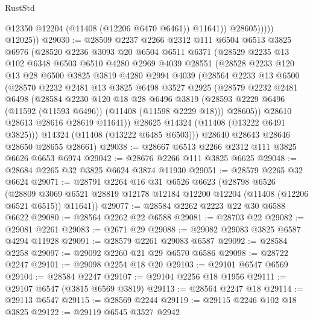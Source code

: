 \begin{lexlean}{RustStd}
\begin{coremodule}
                      @12350
                      @12204
                      (@11408 (@12206 @6470 @6461))
                      @11641))
                  @28605)))))
        @12025))
@29030 := @28509
    @2237
    @2266
    @2312
    @111
    @6504
    @6513
    @3825
    @6976
    (@28520
      @2236
      @3093
      @20
      @6504
      @6511
      @6371
      (@28529
        @2235
        @13
        @102
        @6348
        @6503
        @6510
        @4280
        @2969
        @4039
        @28551
        (@28528
          @2233
          @120
          @13
          @28
          @6500
          @3825
          @3819
          @4280
          @2994
          @4039
          (@28564
            @2233
            @13
            @6500
            (@28570
              @2232
              @2481
              @13
              @3825
              @6498
              @3527
              @2925
              (@28579
                @2232
                @2481
                @6498
                (@28584
                  @2230
                  @120
                  @18
                  @28
                  @6496
                  @3819
                  (@28593 @2229 @6496 (@11592 (@11593 @6496)) (@11408 (@11598 @2229 @18)))
                  @28605))
              @28610
              @28613
              @28616
              @28619
              @11641))
          @28625
          @14324
          (@11408 (@13222 @6491 @3825)))
        @14324
        (@11408 (@13222 @6485 @6503)))
      @28640
      @28643
      @28646
      @28650
      @28655
      @28661)
@29038 := @28667 @6513 @2266 @2312 @111 @3825 @6626 @6653 @6974
@29042 := @28676 @2266 @111 @3825 @6625
@29048 := @28684 @2265 @32 @3825 @6624 @3874 @11930
@29051 := @28579 @2265 @32 @6624
@29071 := @28791
    @2264
    @16
    @31
    @6526
    @6623
    (@28798
      @6526
      (@28809 @3069 @6521 @28819 @12178 @12184 @12200 @12204 (@11408 (@12206 @6521 @6515)) @11641))
@29077 := @28584 @2262 @2223 @22 @30 @6588 @6622
@29080 := @28564 @2262 @22 @6588
@29081 := @28703 @22
@29082 := @29081 @2261
@29083 := @2671 @29
@29088 := @29082 @29083 @3825 @6587 @4294 @11928
@29091 := @28579 @2261 @29083 @6587
@29092 := @28584 @2258
@29097 := @29092 @2260 @21 @29 @6570 @6586
@29098 := @28722 @2247
@29101 := @29098 @2254 @18 @20
@29103 := @29101 @6547 @6569
@29104 := @28584 @2247
@29107 := @29104 @2256 @18 @1956
@29111 := @29107 @6547 (@3815 @6569 @3819)
@29113 := @28564 @2247 @18
@29114 := @29113 @6547
@29115 := @28569 @2244
@29119 := @29115 @2246 @102 @18 @3825
@29122 := @29119 @6545 @3527 @2942

\end{coremodule}
\end{lexlean}
